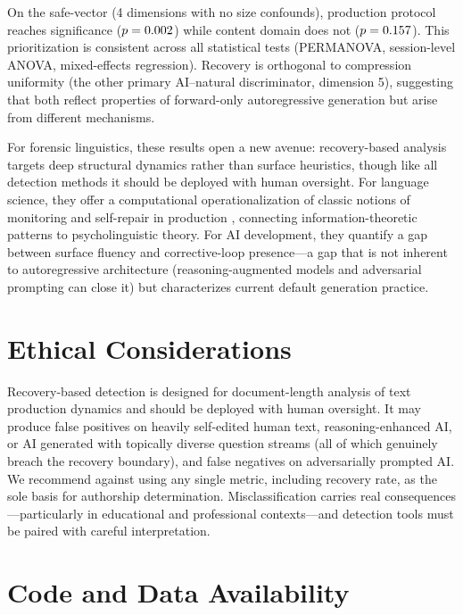 \documentclass[final]{clv2025}
\begin{document}
On the safe-vector (4 dimensions with no size confounds), production protocol reaches significance ($p = 0.002$) while content domain does not ($p = 0.157$). This prioritization is consistent across all statistical tests (PERMANOVA, session-level ANOVA, mixed-effects regression). Recovery is orthogonal to compression uniformity (the other primary AI--natural discriminator, dimension 5), suggesting that both reflect properties of forward-only autoregressive generation but arise from different mechanisms.

For forensic linguistics, these results open a new avenue: recovery-based analysis targets deep structural dynamics rather than surface heuristics, though like all detection methods it should be deployed with human oversight. For language science, they offer a computational operationalization of classic notions of monitoring and self-repair in production \citep{levelt1983monitoring}, connecting information-theoretic patterns to psycholinguistic theory. For AI development, they quantify a gap between surface fluency and corrective-loop presence---a gap that is not inherent to autoregressive architecture (reasoning-augmented models and adversarial prompting can close it) but characterizes current default generation practice.


\section*{Ethical Considerations}

Recovery-based detection is designed for document-length analysis of text production dynamics and should be deployed with human oversight. It may produce false positives on heavily self-edited human text, reasoning-enhanced AI, or AI generated with topically diverse question streams (all of which genuinely breach the recovery boundary), and false negatives on adversarially prompted AI. We recommend against using any single metric, including recovery rate, as the sole basis for authorship determination. Misclassification carries real consequences---particularly in educational and professional contexts---and detection tools must be paired with careful interpretation.

\section*{Code and Data Availability}
\end{document}
